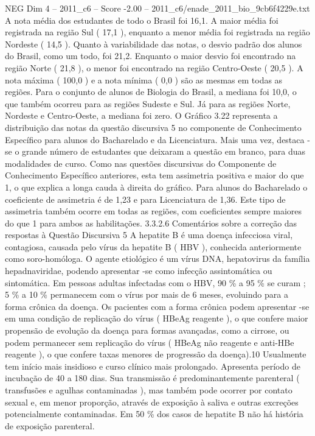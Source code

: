 \begin{textsample}{NEG Dim 4 – 2011\_c6 – Score -2.00 – 2011\_c6/enade\_2011\_bio\_9cb6f4229e.txt}
A nota média dos estudantes de todo o Brasil foi 16,1.
A maior média foi registrada na região Sul ( 17,1 ), enquanto a menor média foi registrada na região Nordeste ( 14,5 ).
Quanto à variabilidade das notas, o desvio padrão dos alunos do Brasil, como um todo, foi 21,2.
Enquanto o maior desvio foi encontrado na região Norte ( 21,8 ), o menor foi encontrado na região Centro-Oeste ( 20,5 ).
A nota máxima ( 100,0 ) e a nota mínima ( 0,0 ) são as mesmas em todas as regiões.
Para o conjunto de alunos de Biologia do Brasil, a mediana foi 10,0, o que também ocorreu para as regiões Sudeste e Sul.
Já para as regiões Norte, Nordeste e Centro-Oeste, a mediana foi zero.
O Gráfico 3.22 representa a distribuição das notas da questão discursiva 5 no componente de Conhecimento Específico para alunos do Bacharelado e da Licenciatura.
Mais uma vez, destaca -se o grande número de estudantes que deixaram a questão em branco, para duas modalidades de curso.
Como nas questões discursivas do Componente de Conhecimento Específico anteriores, esta tem assimetria positiva e maior do que 1, o que explica a longa cauda à direita do gráfico.
Para alunos do Bacharelado o coeficiente de assimetria é de 1,23 e para Licenciatura de 1,36.
Este tipo de assimetria também ocorre em todas as regiões, com coeficientes sempre maiores do que 1 para ambos as habilitações. 3.3.2.6 Comentários sobre a correção das respostas à Questão Discursiva 5 A hepatite B é uma doença infecciosa viral, contagiosa, causada pelo vírus da hepatite B ( HBV ), conhecida anteriormente como soro-homóloga.
O agente etiológico é um vírus DNA, hepatovirus da família hepadnaviridae, podendo apresentar -se como infecção assintomática ou sintomática.
Em pessoas adultas infectadas com o HBV, 90 \% a 95 \% se curam ; 5 \% a 10 \% permanecem com o vírus por mais de 6 meses, evoluindo para a forma crônica da doença.
Os pacientes com a forma crônica podem apresentar -se em uma condição de replicação do vírus ( HBeAg reagente ), o que confere maior propensão de evolução da doença para formas avançadas, como a cirrose, ou podem permanecer sem replicação do vírus ( HBeAg não reagente e anti-HBe reagente ), o que confere taxas menores de progressão da doença).10 Usualmente tem início mais insidioso e curso clínico mais prolongado.
Apresenta período de incubação de 40 a 180 dias.
Sua transmissão é predominantemente parenteral ( transfusões e agulhas contaminadas ), mas também pode ocorrer por contato sexual e, em menor proporção, através de exposição à saliva e outras excreções potencialmente contaminadas.
Em 50 \% dos casos de hepatite B não há história de exposição parenteral.

\end{textsample}
